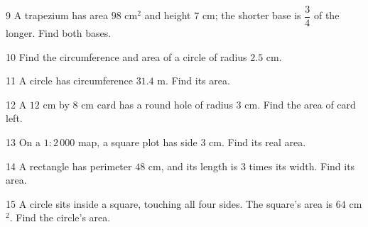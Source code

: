 \gap
\begin{probbox}{9}{\relax}
A trapezium has area $98$ cm$^2$ and height $7$ cm; the shorter base is $\dfrac34$ of the longer. Find both bases.
\end{probbox}
\gap
\begin{probbox}{10}{\relax}
Find the circumference and area of a circle of radius $2.5$ cm.
\end{probbox}
\gap
\begin{probbox}{11}{\relax}
A circle has circumference $31.4$ m. Find its area.
\end{probbox}
\gap
\begin{probbox}{12}{\relax}
A $12$ cm by $8$ cm card has a round hole of radius $3$ cm. Find the area of card left.
\end{probbox}
\gap
\begin{probbox}{13}{\relax}
On a $1:2\,000$ map, a square plot has side $3$ cm. Find its real area.
\end{probbox}
\gap
\begin{probbox}{14}{}
A rectangle has perimeter $48$ cm, and its length is $3$ times its width. Find its area.
\end{probbox}
\gap
\begin{probbox}{15}{}
A circle sits inside a square, touching all four sides. The square's area is $64$ cm$^2$. Find the circle's area.
\end{probbox}
